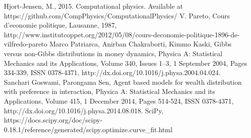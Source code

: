 \documentclass{article}
\begin{document}
\clearpage
\begin{thebibliography}{1}
 Hjort-Jensen, M., 2015. Computational physics. Available at https://github.com/CompPhysics/ComputationalPhysics/
 V. Pareto, Cours d'economie politique, Lausanne, 1987, http://www.institutcoppet.org/2012/05/08/cours-deconomie-politique-1896-de-vilfredo-pareto
 Marco Patriarca, Anirban Chakraborti, Kimmo Kaski, Gibbs versus non-Gibbs distributions in money dynamics, Physica A: Statistical Mechanics and its Applications, Volume 340, Issues 1–3, 1 September 2004, Pages 334-339, ISSN 0378-4371, http://dx.doi.org/10.1016/j.physa.2004.04.024.
 Sanchari Goswami, Parongama Sen, Agent based models for wealth distribution with preference in interaction, Physica A: Statistical Mechanics and its Applications, Volume 415, 1 December 2014, Pages 514-524, ISSN 0378-4371, http://dx.doi.org/10.1016/j.physa.2014.08.018.
 SciPy, https://docs.scipy.org/doc/scipy-0.18.1/reference/generated/scipy.optimize.curve\_fit.html
\end{thebibliography}
\end{document}
